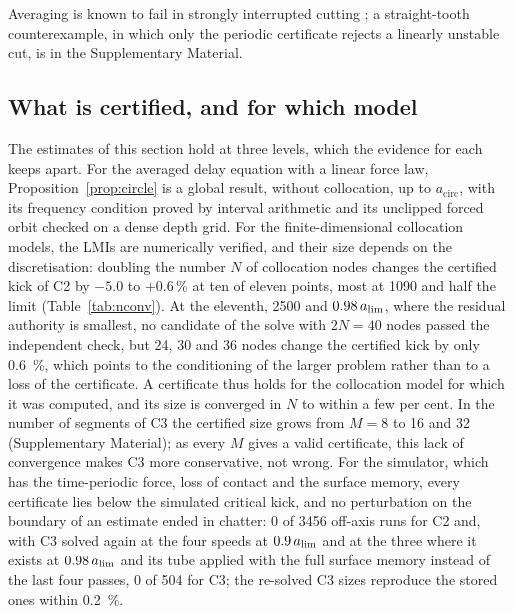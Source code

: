 Averaging is known to fail in strongly interrupted cutting \citep{davies2002stability,bayly2003stability,merdol2004multi}; a straight-tooth counterexample, in which only the periodic certificate rejects a linearly unstable cut, is in the Supplementary Material.

\subsection{What is certified, and for which model}\label{sec:cert-levels}

The estimates of this section hold at three levels, which the evidence for each keeps apart. For the averaged delay equation with a linear force law, Proposition~\ref{prop:circle} is a global result, without collocation, up to $a_{\mathrm{circ}}$, with its frequency condition proved by interval arithmetic and its unclipped forced orbit checked on a dense depth grid. For the finite-dimensional collocation models, the LMIs are numerically verified, and their size depends on the discretisation: doubling the number $N$ of collocation nodes changes the certified kick of C2 by $-5.0$ to $+0.6$\,\% at ten of eleven points, most at \SI{1090}{\rpm} and half the limit (Table~\ref{tab:nconv}). At the eleventh, \SI{2500}{\rpm} and $0.98\,a_{\lim}$, where the residual authority is smallest, no candidate of the solve with $2N=40$ nodes passed the independent check, but 24, 30 and 36 nodes change the certified kick by only \SI{0.6}{\percent}, which points to the conditioning of the larger problem rather than to a loss of the certificate. A certificate thus holds for the collocation model for which it was computed, and its size is converged in $N$ to within a few per cent. In the number of segments of C3 the certified size grows from $M=8$ to 16 and 32 (Supplementary Material); as every $M$ gives a valid certificate, this lack of convergence makes C3 more conservative, not wrong. For the simulator, which has the time-periodic force, loss of contact and the surface memory, every certificate lies below the simulated critical kick, and no perturbation on the boundary of an estimate ended in chatter: 0 of 3456 off-axis runs for C2 and, with C3 solved again at the four speeds at $0.9\,a_{\lim}$ and at the three where it exists at $0.98\,a_{\lim}$ and its tube applied with the full surface memory instead of the last four passes, 0 of 504 for C3; the re-solved C3 sizes reproduce the stored ones within \SI{0.2}{\percent}.
